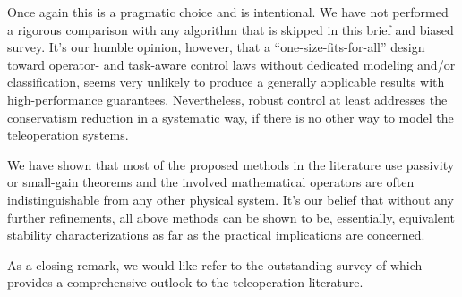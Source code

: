 Once again this is a pragmatic choice and is intentional. We have not performed a rigorous comparison with any algorithm that is 
skipped in this brief and biased survey. It's our humble opinion, however, that a \enquote{one-size-fits-for-all} design 
toward operator- and task-aware control laws without dedicated modeling and/or classification, seems very 
unlikely to produce a generally applicable results with high-performance guarantees. Nevertheless, robust 
control at least addresses the conservatism reduction in a systematic way, if there is no other way to model the 
teleoperation systems.


We have shown that most of the proposed methods in the literature use passivity or small-gain theorems  and 
the involved mathematical operators are often indistinguishable from any other physical system. It's our belief that
without any further refinements, all above methods can be shown to be, essentially, equivalent stability 
characterizations as far as the practical implications are concerned.

As a closing remark, we would like refer to the outstanding survey of \cite{klomp} which provides a comprehensive 
outlook to the teleoperation literature.